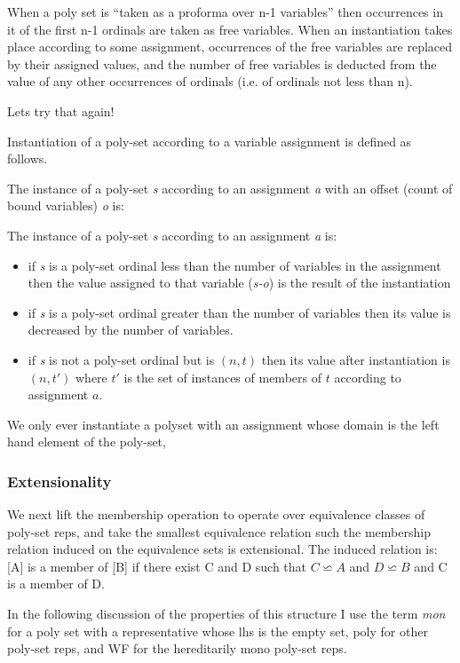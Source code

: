 \documentclass[numreferences]{rbjk}
\begin{document}
\begin{article}
When a poly set is ``taken as a proforma over n-1 variables'' then occurrences in it of the first n-1 ordinals are taken as free variables.
When an instantiation takes place according to some assignment, occurrences of the free variables are replaced by their assigned values, and the number of free variables is deducted from the value of any other occurrences of ordinals (i.e. of ordinals not less than n).

Lets try that again!

Instantiation of a poly-set according to a variable assignment is defined as follows.

The instance of a poly-set \emph{s} according to an assignment \emph{a} with an offset (count of bound variables) \emph{o} is:

The instance of a poly-set \emph{s} according to an assignment \emph{a} is:
\begin{itemize}
\item if \emph{s} is a poly-set ordinal less than the number of variables in the assignment then the value assigned to that variable (\emph{s-o}) is the result of the instantiation
\item if \emph{s} is a poly-set ordinal greater than the number of variables then its value is decreased by the number of variables.
\item if \emph{s} is not a poly-set ordinal but is $(n,t)$ then its value after instantiation is $(n,t')$ where $t'$ is the set of instances of members of $t$ according to assignment $a$.
\end{itemize}

We only ever instantiate a polyset with an assignment whose domain is the left hand element of the poly-set,

\subsubsection{Extensionality}

We next lift the membership operation to operate over equivalence classes of poly-set reps, and take the smallest equivalence relation such the membership relation induced on the equivalence sets is extensional.
The induced relation is: [A] is a member of [B] if there exist C and D such that $C \backsimeq A$ and $D \backsimeq B$ and C is a member of D.

In the following discussion of the properties of this structure I use the term {\it mon} for a poly set with a representative whose lhs is the empty set, poly for other poly-set reps, and WF for the hereditarily mono poly-set reps.


\end{article}
\end{document}
